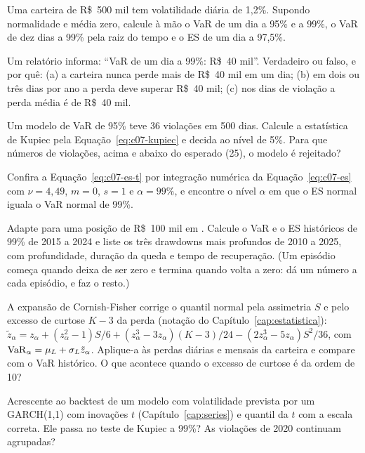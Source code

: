 \begin{exercicios}
  \item {} Uma carteira de R\$~500 mil tem volatilidade diária de 1,2\%. Supondo normalidade e média zero, calcule à mão o VaR de um dia a 95\% e a 99\%, o VaR de dez dias a 99\% pela raiz do tempo e o ES de um dia a 97,5\%.
  \item {} Um relatório informa: ``VaR de um dia a 99\%: R\$~40 mil''. Verdadeiro ou falso, e por quê: (a) a carteira nunca perde mais de R\$~40 mil em um dia; (b) em dois ou três dias por ano a perda deve superar R\$~40 mil; (c) nos dias de violação a perda média é de R\$~40 mil.
  \item {} Um modelo de VaR de 95\% teve 36 violações em 500 dias. Calcule a estatística de Kupiec pela Equação~\eqref{eq:c07-kupiec} e decida ao nível de 5\%. Para que números de violações, acima e abaixo do esperado (25), o modelo é rejeitado?
  \item {} Confira a Equação~\eqref{eq:c07-es-t} por integração numérica da Equação~\eqref{eq:c07-es} com $\nu = 4,49$, $m = 0$, $s = 1$ e $\alpha = 99\%$, e encontre o nível $\alpha$ em que o ES normal iguala o VaR normal de 99\%.
  \item {} Adapte  para uma posição de R\$~100 mil em . Calcule o VaR e o ES históricos de 99\% de 2015 a 2024 e liste os três drawdowns mais profundos de 2010 a 2025, com profundidade, duração da queda e tempo de recuperação. (Um episódio começa quando  deixa de ser zero e termina quando volta a zero:  dá um número a cada episódio, e  faz o resto.)
  \item {} A expansão de Cornish-Fisher corrige o quantil normal pela assimetria $S$ e pelo excesso de curtose $K - 3$ da perda (notação do Capítulo~\ref{cap:estatistica}): $\tilde{z}_\alpha = z_\alpha + (z_\alpha^2 - 1)S/6 + (z_\alpha^3 - 3z_\alpha)(K-3)/24 - (2z_\alpha^3 - 5z_\alpha)S^2/36$, com $\operatorname{VaR}_\alpha = \mu_L + \sigma_L \tilde{z}_\alpha$. Aplique-a às perdas diárias e mensais da carteira e compare com o VaR histórico. O que acontece quando o excesso de curtose é da ordem de 10?
  \item {} Acrescente ao backtest de  um modelo com volatilidade prevista por um GARCH(1,1) com inovações $t$ (Capítulo~\ref{cap:series}) e quantil da $t$ com a escala correta. Ele passa no teste de Kupiec a 99\%? As violações de 2020 continuam agrupadas?
\end{exercicios}

